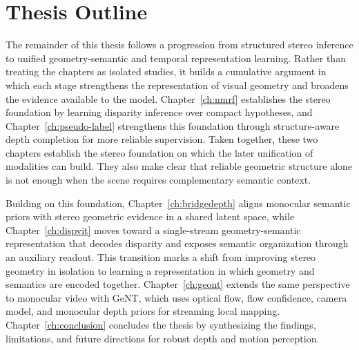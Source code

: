 \section{Thesis Outline}
The remainder of this thesis follows a progression from structured stereo inference to unified geometry-semantic and temporal representation learning.
Rather than treating the chapters as isolated studies, it builds a cumulative argument in which each stage strengthens the representation of visual geometry and broadens the evidence available to the model.
Chapter~\ref{ch:nmrf} establishes the stereo foundation by learning disparity inference over compact hypotheses, and Chapter~\ref{ch:pseudo-label} strengthens this foundation through structure-aware depth completion for more reliable supervision.
Taken together, these two chapters establish the stereo foundation on which the later unification of modalities can build.
They also make clear that reliable geometric structure alone is not enough when the scene requires complementary semantic context.

Building on this foundation, Chapter~\ref{ch:bridgedepth} aligns monocular semantic priors with stereo geometric evidence in a shared latent space, while Chapter~\ref{ch:dispvit} moves toward a single-stream geometry-semantic representation that decodes disparity and exposes semantic organization through an auxiliary readout.
This transition marks a shift from improving stereo geometry in isolation to learning a representation in which geometry and semantics are encoded together.
Chapter~\ref{ch:geont} extends the same perspective to monocular video with GeNT, which uses optical flow, flow confidence, camera model, and monocular depth priors for streaming local mapping.
Chapter~\ref{ch:conclusion} concludes the thesis by synthesizing the findings, limitations, and future directions for robust depth and motion perception.
